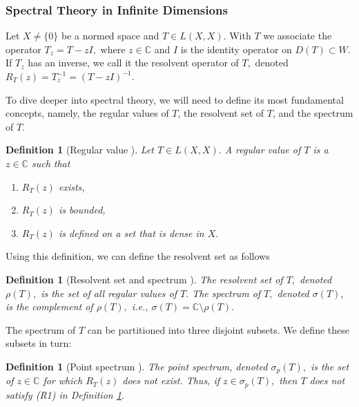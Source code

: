 \documentclass[12pt,a4paper]{article}
\theoremstyle{boldthm}
\theoremstyle{bolddefn}
\newtheorem{definition}[theorem]{Definition}
\begin{document}
\subsubsection{Spectral Theory in Infinite Dimensions}


Let $X \ne \{0\}$ be a normed space and $T \in L(X, X).$ With $T$ we associate the operator $T_z = T - zI,$ where $z \in \mathbb{C}$ and $I$ is the identity operator on $D(T) \subset W.$ If $T_z$ has an inverse, we call it the resolvent operator of $T,$ denoted $R_T(z) = T_z^{-1} = (T-zI)^{-1}.$  



 To dive deeper into spectral theory, we will need to define its most fundamental concepts, namely, the regular values of $T$, the resolvent set of $T$, and the spectrum of $T.$

 \begin{definition}[{Regular value \cite[7.2-1]{krey}}] \label{reg}
 Let $T \in L(X, X).$ A regular value of $T$ is a $z \in \mathbb{C}$ such that 
\begin{enumerate}[label=(R\arabic*)]
    \item $R_T(z)$ exists,
    \item $R_T(z)$ is bounded,
    \item $R_T(z)$ is defined on a set that is dense in $X.$
\end{enumerate}
     
 \end{definition}

 Using this definition, we can define the resolvent set as follows 

 \begin{definition}[{Resolvent set and spectrum \cite[7.2-1]{krey}}]  \label{K spectrum}
     The resolvent set of $T,$ denoted $\rho(T),$ is the set of all regular values of $T.$ The spectrum of $T,$ denoted $\sigma(T),$ is the complement of $\rho(T),$ i.e., $\sigma(T) = \mathbb{C} \setminus \rho(T).$
 \end{definition}


The spectrum of $T$ can be partitioned into three disjoint subsets. We define these subsets in turn:

\begin{definition}[{Point spectrum \cite[7.2-1]{krey}}]  \label{sp}
    The point spectrum, denoted $\sigma_p(T),$ is the set of $z \in \mathbb{C}$ for which $R_T(z)$ does not exist. Thus, if $z \in \sigma_p(T),$ then $T$ does not satisfy (R1) in Definition \ref{reg}.
\end{definition}
\end{document}

